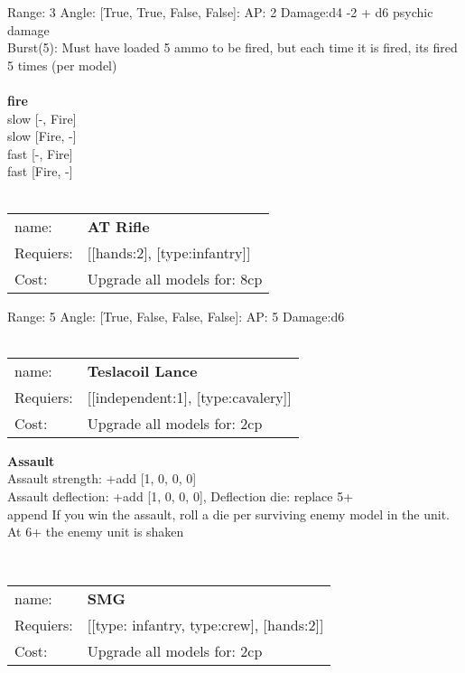 Range: 3  Angle: [True, True, False, False]: AP: 2 Damage:d4 -2 + d6 psychic damage \\
Burst(5): Must have loaded 5 ammo to be fired, but each time it is fired, its fired 5 times (per model)\\ 







\ \\ {\bf fire } \\
slow [-, Fire] \\
slow [Fire, -] \\
fast [-, Fire] \\
fast [Fire, -] \\

\ \\
\begin{tabular}{ll}
name: & {\bf AT Rifle } \\
Requiers: & [[hands:2], [type:infantry]] \\
Cost: & Upgrade all models for: 8cp \\
\end{tabular}



Range: 5  Angle: [True, False, False, False]: AP: 5 Damage:d6 \\








\ \\
\begin{tabular}{ll}
name: & {\bf Teslacoil Lance } \\
Requiers: & [[independent:1], [type:cavalery]] \\
Cost: & Upgrade all models for: 2cp \\
\end{tabular}





{\bf Assault} \ \\
Assault strength: +add [1, 0, 0, 0] 
\\ 
Assault deflection: +add [1, 0, 0, 0], Deflection die: replace 5+
\\ 

append If you win the assault, roll a die per surviving enemy model in the unit. At 6+ the enemy unit is shaken


\ \\
\begin{tabular}{ll}
name: & {\bf SMG } \\
Requiers: & [[type: infantry, type:crew], [hands:2]] \\
Cost: & Upgrade all models for: 2cp \\
\end{tabular}



